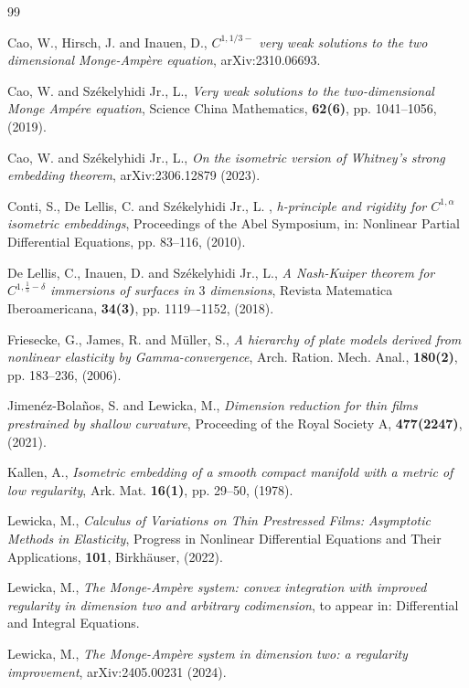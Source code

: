 \documentclass[reqno,twoside,11pt]{amsart}
\numberwithin{equation}{section}
\theoremstyle{plain}
\theoremstyle{definition}
\begin{document}
\begin{thebibliography}{99}

 {\sc Cao, W., Hirsch, J. and Inauen, D.}, 
{\em $C^{1,1/3-}$ very weak solutions to the two dimensional
  Monge-Amp\`ere equation}, arXiv:2310.06693. 

 {\sc Cao, W. and Sz\'ekelyhidi Jr., L.}, {\em Very weak
    solutions to the two-dimensional Monge Amp\'ere equation}, 
  Science China Mathematics, {\bf 62(6)}, pp. 1041--1056, (2019).

 {\sc Cao, W. and Sz\'ekelyhidi Jr., L.}, {\em On the
    isometric version of Whitney's strong embedding theorem}, 
 arXiv:2306.12879 (2023).

 {\sc Conti, S., De Lellis, C. and Sz\'ekelyhidi Jr.,
    L. }, {\em h-principle and rigidity for $C^{1,\alpha}$ isometric embeddings},
Proceedings of the Abel Symposium, in: Nonlinear Partial Differential
Equations, pp. 83--116, (2010).

 {\sc De Lellis, C., Inauen, D. and Sz\'ekelyhidi Jr.,
    L.}, {\em A Nash-Kuiper theorem for $C^{1,\frac{1}{5}-\delta}$ immersions of
surfaces in $3$ dimensions}, Revista Matematica Iberoamericana, {\bf
34(3)}, pp. 1119–-1152, (2018).

 {\sc Friesecke, G.,  James, R. and M\"uller, S.}, {\em A hierarchy 
of plate models derived from nonlinear elasticity by Gamma-convergence}, 
Arch. Ration. Mech. Anal.,  {\bf 180(2)},  pp. 183--236, (2006).

 {\sc Jimen\'ez-Bola\~nos, S. and Lewicka, M.},
{\em Dimension reduction for thin films prestrained by shallow
  curvature}, Proceeding of the Royal Society A, {\bf 477(2247)}, (2021).

 {\sc Kallen, A.},
{\em Isometric embedding of a smooth compact manifold with a metric of
  low regularity}, Ark. Mat. {\bf 16(1)}, pp. 29--50, (1978).

 {\sc Lewicka, M.},
{\em Calculus of Variations on Thin Prestressed Films: Asymptotic
  Methods in Elasticity}, Progress in Nonlinear Differential Equations
and Their Applications, {\bf 101}, Birkh\"auser, (2022). 

 {\sc Lewicka, M.},
{\em The Monge-Amp\`ere system: convex integration with
  improved regularity in dimension two and arbitrary
  codimension}, to appear in: Differential and Integral Equations.

 {\sc Lewicka, M.},
{\em The Monge-Amp\`ere system in dimension two: a regularity
  improvement}, arXiv:2405.00231 (2024).


\end{thebibliography}
\end{document}
